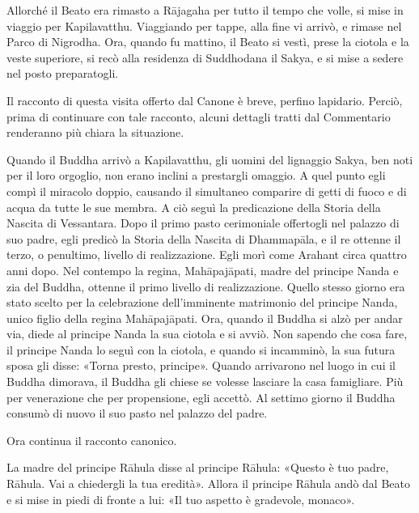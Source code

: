 
 Allorché il Beato era rimasto a Rājagaha per tutto il
tempo che volle, si mise in viaggio per Kapilavatthu. Viaggiando per tappe, alla
fine vi arrivò, e rimase nel Parco di Nigrodha. Ora, quando fu mattino, il Beato
si vestì, prese la ciotola e la veste superiore, si recò alla residenza di
Suddhodana il Sakya, e si mise a sedere nel posto preparatogli.


 Il racconto di questa visita offerto dal Canone è
breve, perfino lapidario. Perciò, prima di continuare con tale racconto, alcuni
dettagli tratti dal Commentario renderanno più chiara la situazione.

 Quando il Buddha arrivò a Kapilavatthu, gli uomini
del lignaggio Sakya, ben noti per il loro orgoglio, non erano inclini a
prestargli omaggio. A quel punto egli compì il miracolo doppio, causando il
simultaneo comparire di getti di fuoco e di acqua da tutte le sue membra. A ciò
seguì la predicazione della Storia della Nascita di Vessantara. Dopo il primo
pasto cerimoniale offertogli nel palazzo di suo padre, egli predicò la Storia
della Nascita di Dhammapāla, e il re ottenne il terzo, o penultimo, livello di
realizzazione. Egli morì come Arahant circa quattro anni dopo. Nel contempo la
regina, Mahāpajāpati, madre del principe Nanda e zia del Buddha, ottenne il
primo livello di realizzazione. Quello stesso giorno era stato scelto per la
celebrazione dell’imminente matrimonio del principe Nanda, unico figlio della
regina Mahāpajāpati. Ora, quando il Buddha si alzò per andar via, diede al
principe Nanda la sua ciotola e si avviò. Non sapendo che cosa fare, il principe
Nanda lo seguì con la ciotola, e quando si incamminò, la sua futura sposa gli
disse: «Torna presto, principe». Quando arrivarono nel luogo in cui il Buddha
dimorava, il Buddha gli chiese se volesse lasciare la casa famigliare. Più per
venerazione che per propensione, egli accettò. Al settimo giorno il Buddha
consumò di nuovo il suo pasto nel palazzo del padre.

 Ora continua il racconto canonico.

 La madre del principe Rāhula disse al principe Rāhula:
«Questo è tuo padre, Rāhula. Vai a chiedergli la tua eredità». Allora il
principe Rāhula andò dal Beato e si mise in piedi di fronte a lui: «Il tuo
aspetto è gradevole, monaco».


